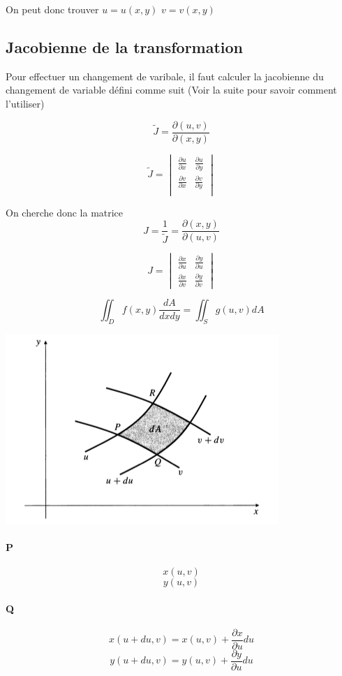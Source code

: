 On peut donc trouver
$u=u(x,y)$
$v=v(x,y)$
\subsection{Jacobienne de la transformation}

Pour effectuer un changement de varibale, il faut calculer la jacobienne du changement de variable défini comme suit (Voir la suite pour savoir comment l'utiliser)

\[\tilde{J}=\frac{\partial ( u,v)}{\partial ( x,y) }\]

\[\tilde{J} =
\begin{vmatrix}
\frac{\partial u}{\partial x} &\frac{\partial u}{\partial y}\\
\frac{\partial v}{\partial x} &\frac{\partial v}{\partial y}\\
\end{vmatrix}
\]

On cherche donc la matrice $$J=\dfrac{1}{\tilde{J}}=\frac{\partial ( x,y) }{\partial ( u,v)}$$


$$J = \begin{vmatrix}
\frac{\partial x}{\partial u} &\frac{\partial y}{\partial u}\\
\frac{\partial x} {\partial v}&\frac{\partial y}{\partial v}
\end{vmatrix}$$


\[\iint_D f (x,y) \frac{dA}{dxdy}=\iint_S g(u,v) dA\]

\begin{center}
\includegraphics[scale=0.7]{image9.png}
\end{center}

\paragraph{P}
$$x(u,v)$$
$$y(u,v)$$
\paragraph{Q}
\[x(u+du,v)=x(u,v)+\frac{\partial x}{\partial u} du\]
\[y(u+du,v)=y(u,v)+\frac{\partial y}{\partial u} du\]
